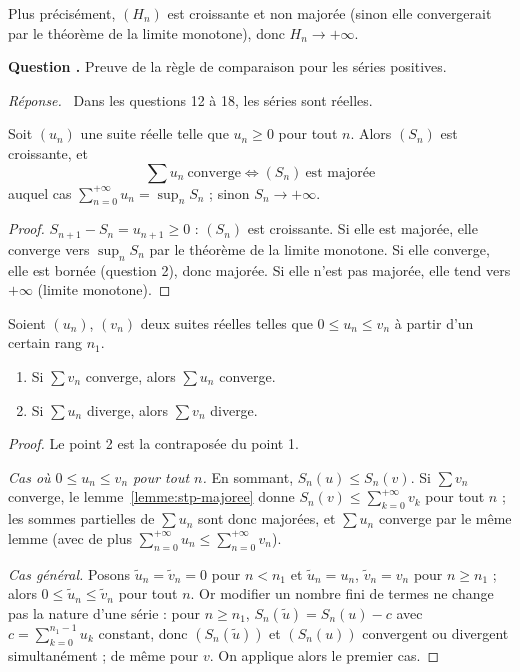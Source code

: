 \documentclass[11pt]{article}
\newcounter{qnum}
\newcommand{\question}[1]{%
\stepcounter{qnum}%
\bigskip
\noindent\textbf{Question \theqnum.} #1\par}
\newcommand{\reponse}{\noindent\textit{Réponse.}\ }
\begin{document}
\begin{remarque}
Plus précisément, $(H_n)$ est croissante et non majorée (sinon elle convergerait par le théorème de la limite monotone), donc $H_n\to+\infty$.
\end{remarque}

\question{Preuve de la règle de comparaison pour les séries positives.}
\reponse
Dans les questions 12 à 18, les séries sont réelles.

\begin{lemme}
\label{lemme:stp-majoree}
Soit $(u_n)$ une suite réelle telle que $u_n\geq 0$ pour tout $n$. Alors $(S_n)$ est croissante, et
\[\sum u_n\ \text{converge}\iff(S_n)\ \text{est majorée}\]
auquel cas $\sum_{n=0}^{+\infty}u_n=\sup_nS_n$ ; sinon $S_n\to+\infty$.
\end{lemme}

\begin{proof}
$S_{n+1}-S_n=u_{n+1}\geq 0$ : $(S_n)$ est croissante. Si elle est majorée, elle converge vers $\sup_nS_n$ par le théorème de la limite monotone. Si elle converge, elle est bornée (question 2), donc majorée. Si elle n'est pas majorée, elle tend vers $+\infty$ (limite monotone).
\end{proof}

\begin{theo}
\label{theo:regle-comparaison}
Soient $(u_n)$, $(v_n)$ deux suites réelles telles que $0\leq u_n\leq v_n$ à partir d'un certain rang $n_1$.
\begin{enumerate}
\item Si $\sum v_n$ converge, alors $\sum u_n$ converge.
\item Si $\sum u_n$ diverge, alors $\sum v_n$ diverge.
\end{enumerate}
\end{theo}

\begin{proof}
Le point 2 est la contraposée du point 1.

\emph{Cas où $0\leq u_n\leq v_n$ pour tout $n$.} En sommant, $S_n(u)\leq S_n(v)$. Si $\sum v_n$ converge, le lemme~\ref{lemme:stp-majoree} donne $S_n(v)\leq\sum_{k=0}^{+\infty}v_k$ pour tout $n$ ; les sommes partielles de $\sum u_n$ sont donc majorées, et $\sum u_n$ converge par le même lemme (avec de plus $\sum_{n=0}^{+\infty}u_n\leq\sum_{n=0}^{+\infty}v_n$).

\emph{Cas général.} Posons $\tilde u_n=\tilde v_n=0$ pour $n<n_1$ et $\tilde u_n=u_n$, $\tilde v_n=v_n$ pour $n\geq n_1$ ; alors $0\leq\tilde u_n\leq\tilde v_n$ pour tout $n$. Or modifier un nombre fini de termes ne change pas la nature d'une série : pour $n\geq n_1$, $S_n(\tilde u)=S_n(u)-c$ avec $c=\sum_{k=0}^{n_1-1}u_k$ constant, donc $(S_n(\tilde u))$ et $(S_n(u))$ convergent ou divergent simultanément ; de même pour $v$. On applique alors le premier cas.
\end{proof}
\end{document}
